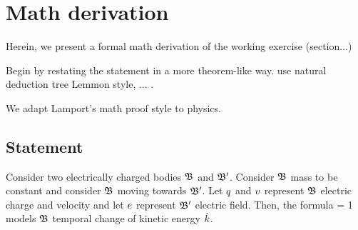 \chapter{Math derivation}
%
Herein, we present a formal math derivation of the working exercise (section...)

Begin by restating the statement in a more theorem-like way. use natural deduction tree Lemmon style, \cite[chap. 1]{lehman:2011} ... \cite{houston:2009}.

We adapt Lamport's math proof style \cite{lamport:1993,lamport:2012} to physics.


\section{Statement}
%
Consider two electrically charged bodies $\mathfrak{B}$ and $\mathfrak{B}'$. Consider $\mathfrak{B}$ mass to be constant and consider $\mathfrak{B}$ moving towards $\mathfrak{B}'$. Let $q$ and $v$ represent $\mathfrak{B}$ electric charge and velocity and let $e$ represent $\mathfrak{B}'$ electric field. Then, the formula
%
\beq
  \dfrac{\dt\ekin}{\echarge\efield\iprod\vel} = 1
\eeq
%
models $\mathfrak{B}$ temporal change of kinetic energy $\dot{k}$.


